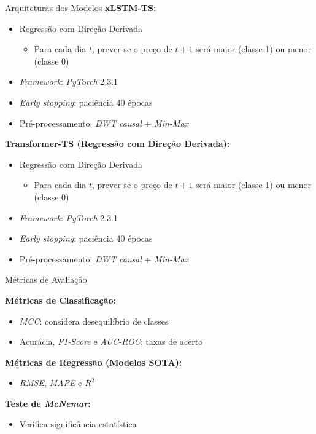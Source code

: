 \documentclass[10pt]{beamer}
\begin{document}
\begin{frame}{Arquiteturas dos Modelos}
\textbf{xLSTM-TS:}
\begin{itemize}
    \item Regressão com Direção Derivada
    \begin{itemize}
        \item Para cada dia $t$, prever se o preço de $t+1$ será maior (classe 1) ou menor (classe 0)
    \end{itemize}
    \item \textit{Framework}: \textit{PyTorch} 2.3.1
    \item \textit{Early stopping}: paciência 40 épocas
    \item Pré-processamento: \textit{DWT} \textit{causal} + \textit{Min-Max}
\end{itemize}

\vspace{0.3cm}
\textbf{Transformer-TS (Regressão com Direção Derivada):}
\begin{itemize}
    \item Regressão com Direção Derivada
    \begin{itemize}
        \item Para cada dia $t$, prever se o preço de $t+1$ será maior (classe 1) ou menor (classe 0)
    \end{itemize}
    \item \textit{Framework}: \textit{PyTorch} 2.3.1
    \item \textit{Early stopping}: paciência 40 épocas
    \item Pré-processamento: \textit{DWT} \textit{causal} + \textit{Min-Max}
\end{itemize}
\end{frame}

\begin{frame}{Métricas de Avaliação}

\vspace{0.3cm}
\textbf{Métricas de Classificação:}
\begin{itemize}
    \item \textit{MCC}: considera desequilíbrio de classes
    \item Acurácia, \textit{F1-Score} e \textit{AUC-ROC}: taxas de acerto
\end{itemize}

\vspace{0.3cm}
\textbf{Métricas de Regressão (Modelos SOTA):}
\begin{itemize}
    \item \textit{RMSE}, \textit{MAPE} e $R^2$
\end{itemize}

\vspace{0.3cm}
\textbf{Teste de \textit{McNemar}:}
\begin{itemize}
    \item Verifica significância estatística
\end{itemize}
\end{frame}
\end{document}
